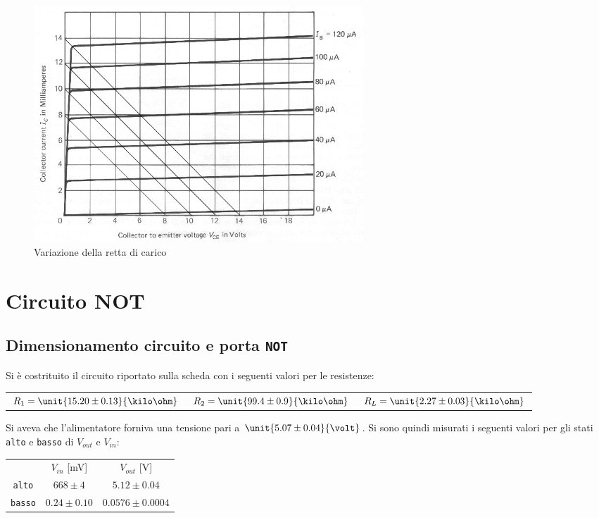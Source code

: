 \documentclass[10pt,a4paper]{article}
\def\code#1{\texttt{#1}}
\begin{document}
\begin{figure}[h!]
	\centering
	\includegraphics[width=0.6\textwidth]{../grafici/spostamento_retta.jpg}
	\caption{Variazione della retta di carico}
	\label{retta_spostamento}
\end{figure}

\section{Circuito NOT}

\subsection{Dimensionamento circuito e porta \code{NOT}}

Si è costrituito il circuito riportato sulla scheda con i seguenti valori per le resistenze:

\begin{table}[h!]
\centering
\begin{tabular}{c|c|c}
$R_1 = \unit{15.20 \pm 0.13}{\kilo\ohm}$ & $R_2 = \unit{99.4 \pm 0.9}{\kilo\ohm}$ & $R_L = \unit{2.27 \pm 0.03}{\kilo\ohm}$
\end{tabular}
\end{table}

Si aveva che l'alimentatore forniva una tensione pari a $\unit{5.07 \pm 0.04}{\volt}$.
Si sono quindi misurati i seguenti valori per gli stati \code{alto} e \code{basso} di $V_{out}$ e $V_{in}$:

\begin{table}[h!]
\centering
\begin{tabular}{c|c|c}
 & $V_{in}$ [mV]& $V_{out}$ [V]\\
\code{alto} & $668 \pm 4$ & $5.12 \pm 0.04$\\
\code{basso} & $0.24 \pm 0.10$ & $0.0576 \pm 0.0004$
\end{tabular}
\end{table}
\end{document}
